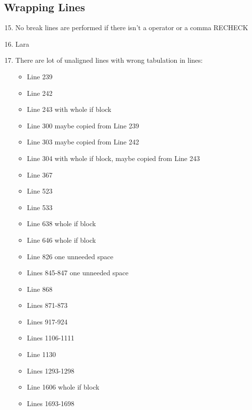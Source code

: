 \subsection{Wrapping Lines}
\begin{enumerate}
	\setcounter{enumi}{14}
	\item No break lines are performed if there isn't a operator or a comma RECHECK
	\item Lara
	\item There are lot of unaligned lines with wrong tabulation in lines:
	\begin{itemize}
		\item Line 239
		\item Line 242
		\item Line 243 with whole if block
		\item Line 300 maybe copied from Line 239
		\item Line 303 maybe copied from Line 242
		\item Line 304 with whole if block, maybe copied from Line 243
		\item Line 367
		\item Line 523
		\item Line 533
		\item Line 638 whole if block
		\item Line 646 whole if block
		\item Line 826 one unneeded space
		\item Lines 845-847 one unneeded space
		\item Line 868
		\item Lines 871-873
		\item Lines 917-924
		\item Lines 1106-1111
		\item Line 1130
		\item Lines 1293-1298
		\item Line 1606 whole if block
		\item Lines 1693-1698
	\end{itemize}
\end{enumerate}
